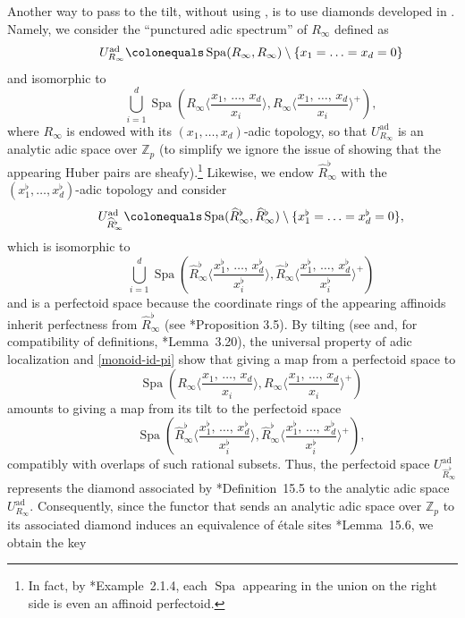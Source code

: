 \documentclass[11pt, reqno]{amsart}
\newcommand{\bZ}{\mathbb{Z}}
\DeclareMathOperator{\Spa}{Spa}		%
\newcommand{\ad}{\mathrm{ad}}			%
\newcommand{\ce}{\colonequals}
\providecommand{\p}[1]{\left(#1\right)}
\newcommand{\wh}{\widehat}
\providecommand{\f}[2]{\frac{#1}{#2}}
\newcommand{\remi}{\addtocounter{numberingbase}{1} \item}
\newcommand{\qqq}{\quad\quad\quad}
\newcommand{\tst}{\textstyle}
\numberwithin{equation}{numberingbase}
\theoremstyle{thms}
\theoremstyle{claims}
\theoremstyle{defs}
\theoremstyle{thms}
\theoremstyle{defs}
\theoremstyle{subsection-tweak}
\theoremstyle{subsection-tweak}
\begin{document}
\remi
Another way to pass to the tilt, without using , is to use diamonds developed in \cite{Sch17}. Namely, we consider the ``punctured adic spectrum'' of $R_\infty$ defined as
\[
\tst \qqq U^\ad_{R_\infty} \ce \Spa(R_\infty, R_\infty) \setminus \{ x_1 = \dotsc = x_d = 0 \}
\]
and isomorphic to
\[
\tst \qqq \bigcup_{i = 1}^{d} \Spa\p{R_\infty\langle\f{x_1,\, \dotsc,\, x_d}{x_i}\rangle, R_\infty\langle\f{x_1,\, \dotsc,\, x_d}{x_i}\rangle^+}\!,
\] 
where $R_\infty$ is endowed with its $(x_1, \dotsc, x_d)$-adic topology, so that $U^\ad_{R_\infty}$ is an analytic adic space over $\bZ_p$ (to simplify we ignore the issue of showing that the appearing Huber pairs are sheafy).\footnote{In fact, by \cite{Nak20}*{Example~2.1.4}, each $\Spa$ appearing in the union on the right side is even an affinoid perfectoid.} Likewise, we endow $\wh{R}_\infty^\flat$ with the $(x_1^\flat, \dotsc, x_d^\flat)$-adic topology and consider 
\[
\tst\qqq U^\ad_{\wh{R}_\infty^\flat} \ce \Spa(\wh{R}_\infty^\flat, \wh{R}_\infty^\flat) \setminus \{ x_1^\flat = \dotsc = x_d^\flat = 0 \},
\] 
which is isomorphic to
\[
\tst \qqq \bigcup_{i = 1}^{d} \Spa\p{\wh{R}_\infty^\flat\langle\f{x_1^\flat,\, \dotsc,\, x_d^\flat}{x_i^\flat}\rangle, \wh{R}_\infty^\flat\langle\f{x_1^\flat,\, \dotsc,\, x_d^\flat}{x_i^\flat}\rangle^+}\!
\]
and is a perfectoid space because the coordinate rings of the appearing affinoids inherit perfectness from $\wh{R}_\infty^\flat$ (see \cite{Sch17}*{Proposition 3.5}). By tilting %
(see  and, for compatibility of definitions, \cite{BMS18}*{Lemma~3.20}), the universal property of adic localization and \eqref{monoid-id-pi} show that giving a map from a perfectoid space to 
\[
\tst\qqq \Spa\p{R_\infty\langle\f{x_1,\, \dotsc,\, x_d}{x_i}\rangle, R_\infty\langle\f{x_1,\, \dotsc,\, x_d}{x_i}\rangle^+}
\]
amounts to giving a map from its tilt to the perfectoid space 
\[
\tst\qqq\Spa\p{\wh{R}_\infty^\flat\langle\f{x_1^\flat,\, \dotsc,\, x_d^\flat}{x_i^\flat}\rangle, \wh{R}_\infty^\flat\langle\f{x_1^\flat,\, \dotsc,\, x_d^\flat}{x_i^\flat}\rangle^+},
\]
compatibly with overlaps of such rational subsets. Thus, the perfectoid space $U^\ad_{\wh{R}_\infty^\flat}$ represents the diamond associated  by \cite{Sch17}*{Definition~15.5} to the analytic adic space $U^\ad_{R_\infty}$.  Consequently, since the functor that sends an analytic adic space over $\bZ_p$ to its associated diamond induces an equivalence of \'{e}tale sites \cite{Sch17}*{Lemma~15.6}, we obtain the key
\end{document}
